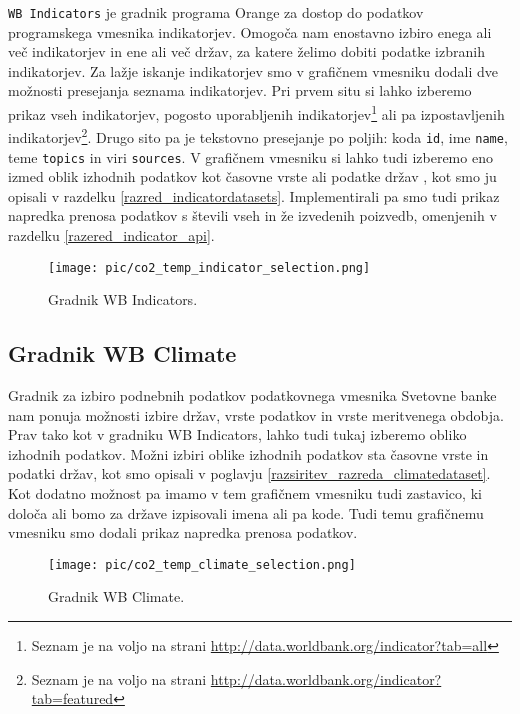 \verb|WB Indicators| je gradnik programa Orange za dostop do podatkov
programskega vmesnika indikatorjev. Omogoča nam enostavno izbiro
enega ali več indikatorjev in ene ali več držav, za katere želimo dobiti
podatke izbranih indikatorjev. Za lažje iskanje indikatorjev smo v grafičnem
vmesniku dodali dve možnosti presejanja seznama indikatorjev. Pri prvem situ
si lahko izberemo prikaz vseh indikatorjev, pogosto uporabljenih 
indikatorjev\footnote{Seznam je na voljo na strani
\url{http://data.worldbank.org/indicator?tab=all}}
ali pa izpostavljenih indikatorjev\footnote{Seznam je na voljo na strani
\url{http://data.worldbank.org/indicator?tab=featured}}. Drugo sito pa je
tekstovno presejanje po poljih: koda {\tt id}, ime {\tt name}, teme {\tt topics} in
viri {\tt sources}. 
V grafičnem vmesniku si lahko tudi izberemo eno izmed oblik izhodnih podatkov
kot časovne vrste  ali podatke držav , 
kot smo ju opisali v razdelku \ref{razred_indicatordatasets}. 
Implementirali pa smo tudi prikaz napredka prenosa podatkov s števili vseh in
že izvedenih poizvedb, omenjenih v razdelku \ref{razered_indicator_api}.


\begin{figure}
\begin{center}
\texttt{[image: pic/co2\_temp\_indicator\_selection.png]}
\end{center}
\caption{Gradnik WB Indicators.}
\label{co2_temp_indicator}
\end{figure} 




\subsection{Gradnik WB Climate}

Gradnik za izbiro podnebnih podatkov podatkovnega vmesnika Svetovne banke nam
ponuja možnosti izbire držav, vrste podatkov in vrste meritvenega obdobja.
Prav tako kot v gradniku WB Indicators, lahko tudi tukaj izberemo obliko izhodnih
podatkov. Možni izbiri oblike izhodnih podatkov sta časovne vrste in podatki
držav, kot smo opisali v poglavju \ref{razsiritev_razreda_climatedataset}. 
Kot dodatno možnost pa imamo v tem grafičnem vmesniku tudi zastavico, ki 
določa ali bomo za države izpisovali imena ali pa kode. Tudi temu grafičnemu
vmesniku smo dodali prikaz napredka prenosa podatkov.



\begin{figure}
\begin{center}
\texttt{[image: pic/co2\_temp\_climate\_selection.png]}
\end{center}
\caption{Gradnik WB Climate.}
\label{co2_temp_climate}
\end{figure} 
